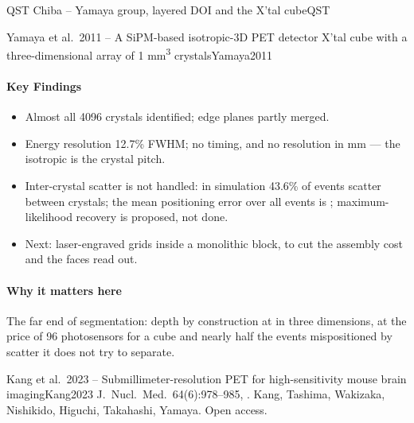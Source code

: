 \begin{programnote}{QST Chiba -- Yamaya group, layered DOI and the X'tal cube}{QST}
\begin{papernote}{Yamaya et al.\ 2011 -- A SiPM-based isotropic-3D PET detector X'tal cube with a three-dimensional array of 1 mm\textsuperscript{3} crystals}{Yamaya2011}
\paragraph{Key Findings}
\begin{itemize}
	\item Almost all 4096 crystals identified; edge planes partly merged.
	\item Energy resolution 12.7\% FWHM; no timing, and no resolution in mm
		--- the isotropic  is the crystal pitch.
	\item Inter-crystal scatter is not handled: in simulation 43.6\% of
		events scatter between crystals; the mean positioning error over all
		events is ; maximum-likelihood recovery is proposed, not done.
	\item Next: laser-engraved grids inside a monolithic block, to cut the
		assembly cost and the faces read out.
\end{itemize}

\paragraph{Why it matters here}
The far end of segmentation: depth by construction at  in three
dimensions, at the price of 96 photosensors for a  cube and nearly half
the events mispositioned by scatter it does not try to separate.
\end{papernote}

\begin{papernote}{Kang et al.\ 2023 -- Submillimeter-resolution PET for high-sensitivity mouse brain imaging}{Kang2023}
J.\ Nucl.\ Med.\ 64(6):978--985, . Kang,
Tashima, Wakizaka, Nishikido, Higuchi, Takahashi, Yamaya. Open access.


\end{papernote}
\end{programnote}
